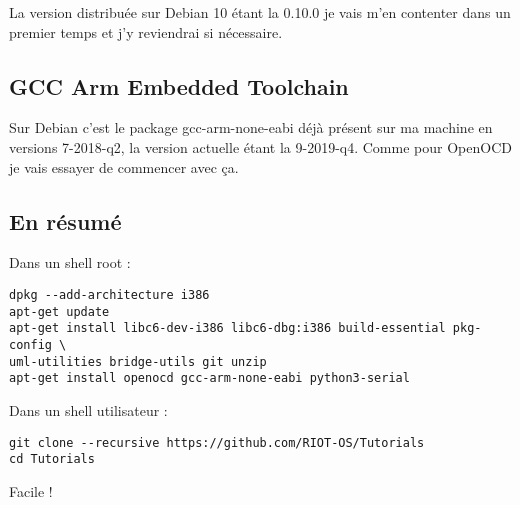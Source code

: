 La version distribuée sur Debian 10 étant la 0.10.0 je vais m'en contenter dans un
premier temps et j'y reviendrai si nécessaire.

\subsection{GCC Arm Embedded Toolchain}

Sur Debian c'est le package gcc-arm-none-eabi déjà présent sur ma machine en versions
7-2018-q2, la version actuelle étant la 9-2019-q4. Comme pour OpenOCD je vais essayer
de commencer avec ça.

\subsection{En résumé}

Dans un shell root :
\begin{verbatim}
dpkg --add-architecture i386
apt-get update
apt-get install libc6-dev-i386 libc6-dbg:i386 build-essential pkg-config \
uml-utilities bridge-utils git unzip
apt-get install openocd gcc-arm-none-eabi python3-serial
\end{verbatim}
Dans un shell utilisateur :
\begin{verbatim}
git clone --recursive https://github.com/RIOT-OS/Tutorials
cd Tutorials
\end{verbatim}

Facile !

